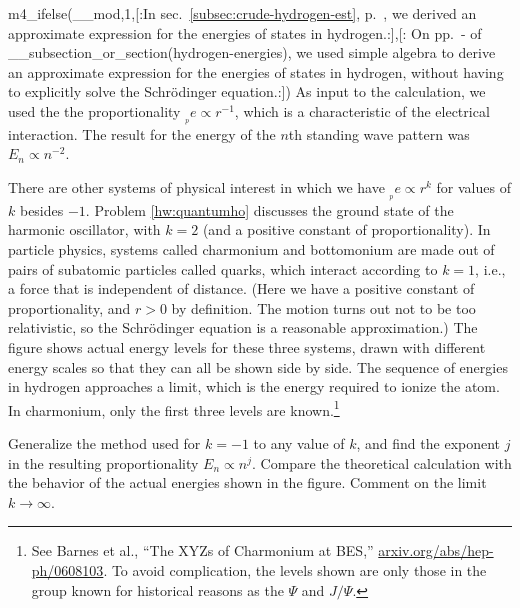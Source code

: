 m4_ifelse(__mod,1,[:In sec.~\ref{subsec:crude-hydrogen-est}, p.~\pageref{subsec:crude-hydrogen-est}, we derived an approximate expression
for the energies of states in hydrogen.:],[:%
On pp.~\pageref{start-approx-hydrogen-energies}-\pageref{end-approx-hydrogen-energies}
of __subsection_or_section(hydrogen-energies), we used simple algebra to derive
an approximate expression for the energies of states in hydrogen, without having to
explicitly solve the Schr\"odinger equation.:])
As input to the calculation, we used the the proportionality $__pe \propto r^{-1}$,
which is a characteristic of the electrical interaction. The result for the
energy of the $n$th standing wave pattern was $E_n \propto n^{-2}$.

There are other systems of physical interest in which we have
$__pe \propto r^k$ for values of $k$ besides $-1$. Problem
\ref{hw:quantumho} discusses the ground state of the harmonic oscillator,
with $k=2$ (and a positive constant of proportionality). In particle physics,
systems called charmonium and bottomonium are made out of pairs of subatomic
particles called quarks, which interact according to $k=1$, i.e., a force that
is independent of distance. (Here we have a positive
constant of proportionality, and $r>0$ by definition.
The motion turns out not to be too relativistic, so 
the Schr\"odinger equation is a reasonable approximation.)
The figure shows actual energy levels for these three systems, drawn with
different energy scales so that they can all be shown side by side.
The sequence of energies in hydrogen approaches a limit, which is the energy
required to ionize the atom. In charmonium, only the first three levels are known.\footnote{See
Barnes et al., ``The XYZs of Charmonium at BES,'' \url{arxiv.org/abs/hep-ph/0608103}. To avoid complication,
the levels shown are only those in the group known for historical reasons as the $\Psi$ and $J/\Psi$.}

Generalize the method used for $k=-1$ to any value of $k$, and find the
exponent $j$ in the resulting proportionality $E_n \propto n^j$.
Compare the theoretical calculation with the behavior of the actual energies shown in the figure.
Comment on the limit $k\rightarrow\infty$.
\answercheck
